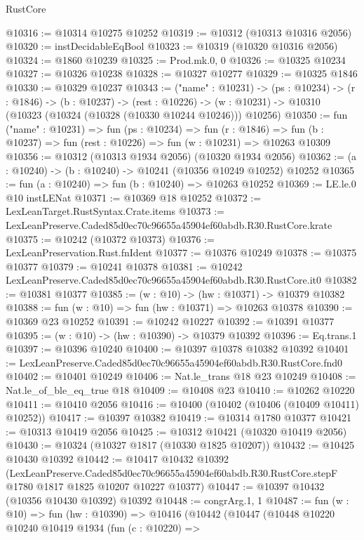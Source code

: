 \begin{lexlean}{RustCore}
\begin{coremodule}
@10316 := @10314 @10275 @10252
@10319 := @10312 (@10313 @10316 @2056)
@10320 := instDecidableEqBool
@10323 := @10319 (@10320 @10316 @2056)
@10324 := @1860 @10239
@10325 := Prod.mk.{0, 0}
@10326 := @10325 @10234
@10327 := @10326 @10238
@10328 := @10327 @10277
@10329 := @10325 @1846
@10330 := @10329 @10237
@10343 := ("name" : @10231) ->
  (ps : @10234) ->
  (r : @1846) ->
  (b : @10237) ->
  (rest : @10226) -> (w : @10231) -> @10310 (@10323 (@10324 (@10328 (@10330 @10244 @10246))) @10256)
@10350 := fun ("name" : @10231) =>
  fun (ps : @10234) =>
  fun (r : @1846) => fun (b : @10237) => fun (rest : @10226) => fun (w : @10231) => @10263 @10309
@10356 := @10312 (@10313 @1934 @2056) (@10320 @1934 @2056)
@10362 := (a : @10240) -> (b : @10240) -> @10241 (@10356 @10249 @10252) @10252
@10365 := fun (a : @10240) => fun (b : @10240) => @10263 @10252
@10369 := LE.le.{0} @10 instLENat
@10371 := @10369 @18 @10252
@10372 := LexLeanTarget.RustSyntax.Crate.items
@10373 := LexLeanPreserve.Caded85d0ec70c96655a45904ef60abdb.R30.RustCore.krate
@10375 := @10242 (@10372 @10373)
@10376 := LexLeanPreservation.Rust.fnIdent
@10377 := @10376 @10249
@10378 := @10375 @10377
@10379 := @10241 @10378
@10381 := @10242 LexLeanPreserve.Caded85d0ec70c96655a45904ef60abdb.R30.RustCore.it0
@10382 := @10381 @10377
@10385 := (w : @10) -> (hw : @10371) -> @10379 @10382
@10388 := fun (w : @10) => fun (hw : @10371) => @10263 @10378
@10390 := @10369 @23 @10252
@10391 := @10242 @10227
@10392 := @10391 @10377
@10395 := (w : @10) -> (hw : @10390) -> @10379 @10392
@10396 := Eq.trans.{1}
@10397 := @10396 @10240
@10400 := @10397 @10378 @10382 @10392
@10401 := LexLeanPreserve.Caded85d0ec70c96655a45904ef60abdb.R30.RustCore.fnd0
@10402 := @10401 @10249
@10406 := Nat.le_trans @18 @23 @10249
@10408 := Nat.le_of_ble_eq_true @18
@10409 := @10408 @23
@10410 := @10262 @10220
@10411 := @10410 @2056
@10416 := @10400 (@10402 (@10406 (@10409 @10411) @10252))
@10417 := @10397 @10382
@10419 := @10314 @1780 @10377
@10421 := @10313 @10419 @2056
@10425 := @10312 @10421 (@10320 @10419 @2056)
@10430 := @10324 (@10327 @1817 (@10330 @1825 @10207))
@10432 := @10425 @10430 @10392
@10442 := @10417
    @10432
    @10392
    (LexLeanPreserve.Caded85d0ec70c96655a45904ef60abdb.R30.RustCore.stepF
      @1780
      @1817
      @1825
      @10207
      @10227
      @10377)
@10447 := @10397 @10432 (@10356 @10430 @10392) @10392
@10448 := congrArg.{1, 1}
@10487 := fun (w : @10) =>
  fun (hw : @10390) =>
  @10416
    (@10442
      (@10447
        (@10448
          @10220
          @10240
          @10419
          @1934
          (fun (c : @10220) =>

\end{coremodule}
\end{lexlean}

